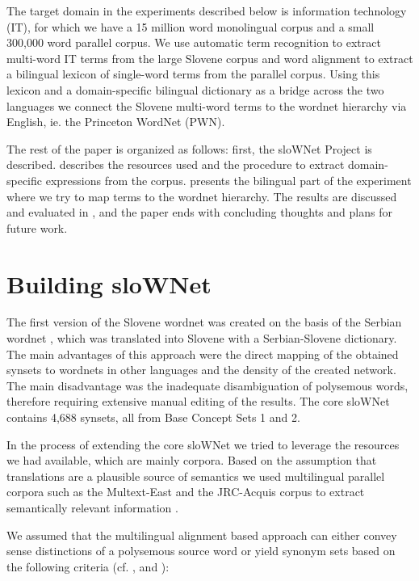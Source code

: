 \documentclass[output=paper]{LSP/langsci}
\begin{document}
The target domain in the experiments described below is information technology (IT), for which we have a 15 million word monolingual corpus and a small 300,000 word parallel corpus. We use automatic term recognition to extract multi-word IT terms from the large Slovene corpus and word alignment to extract a bilingual lexicon of single-word terms from the parallel corpus. Using this lexicon and a domain-specific bilingual dictionary as a bridge across the two languages we connect the Slovene multi-word terms to the wordnet hierarchy via English, ie. the Princeton WordNet (PWN).

The rest of the paper is organized as follows: first, the sloWNet Project is described.  describes the resources used and the procedure to extract domain-specific expressions from the corpus.  presents the bilingual part of the experiment where we try to map terms to the wordnet hierarchy. The results are discussed and evaluated in , and the paper ends with concluding thoughts and plans for future work.

\section{Building sloWNet}\label{sec:vintar:2}

The first version of the Slovene wordnet was created on the basis of the Serbian wordnet \citep{KrstevEtAl2004}, which was translated into Slovene with a Serbian-Slovene dictionary. The main advantages of this approach were the direct mapping of the obtained synsets to wordnets in other languages and the density of the created network. The main disadvantage was the inadequate disambiguation of polysemous words, therefore requiring extensive manual editing of the results. The core sloWNet contains 4,688 synsets, all from Base Concept Sets 1 and 2. 

In the process of extending the core sloWNet we tried to leverage the resources we had available, which are mainly corpora. Based on the assumption that translations are a plausible source of semantics we used multilingual parallel corpora such as the Multext-East \citep{Erjavec1998} and the JRC-Acquis corpus \citep{SteinbergerEtAl2006} to extract semantically relevant information \citep{Fišer2007}.

We assumed that the multilingual alignment based approach can either convey sense distinctions of a polysemous source word or yield synonym sets based on the following criteria (cf. \citealt{Dyvik1998}, \citealt{Diab2002} and \citealt{IdeEtAl2002}):
\end{document}
